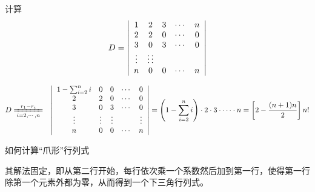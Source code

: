 \begin{frame}
\begin{testexample}
  计算
  $$
  D= \left|
    \begin{array}{ccccc}
      1 &  2  & 3   &\cdots & n   \\
      2 &  2  & 0   &\cdots & 0  \\
      3 &  0  & 3   &\cdots & 0  \\
      \vdots & \vdots  \vdots  &    & \\
      n &  0  & 0   &\cdots & n
    \end{array}
  \right|
  $$
\end{testexample} \pause 
\begin{jie}
  $$
  \begin{aligned}
    D & \xlongequal[i=2,\cd,n]{r_1-r_i} & 
    \left|
      \begin{array}{ccccc}
        1-\sum_{i=2}^n i &  0  & 0   &\cd & 0   \\
        2 &  2  & 0   &\cd & 0  \\
        3 &  0  & 3   &\cd & 0  \\
        \vd & \vd & \vd  &    &\vd  \\
        n &  0  & 0   &\cd & n
      \end{array}
    \right|
    =  \left(1-\sum_{i=2}^n i\right) \cdot 2 \cdot 3 \cdot \cd \cdot n
    =  \left[2-\frac{(n+1)n}2\right] n!
  \end{aligned}
  $$
\end{jie}

\end{frame}

\begin{frame}
如何计算“爪形”行列式
\begin{figure}
  \centering
\end{figure}
其解法固定，即从第二行开始，每行依次乘一个系数然后加到第一行，使得第一行除第一个元素外都为零，从而得到一个下三角行列式。
\end{frame}

